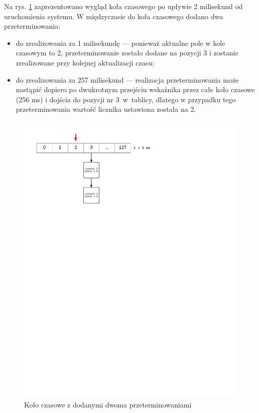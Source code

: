 Na rys. \ref{fig:tiw2} zaprezentowano wygląd koła czasowego po upływie 2 milisekund od uruchomienia systemu.
W międzyczasie do koła czasowego dodano dwa przeterminowania:
\begin{itemize}
\item do zrealizowania za 1 milisekundę --- ponieważ aktualne pole w kole czasowym to 2, przeterminowanie zostało dodane na pozycji 3 i zostanie zrealizowane przy kolejnej aktualizacji czasu;
\item do zrealizowania za 257 milisekund --- realizacja przeterminowania może nastąpić dopiero po dwukrotnym przejściu wskaźnika przez całe koło czasowe (256 ms) i dojścia do pozycji nr 3~w~tablicy, dlatego w przypadku tego przeterminowania wartość licznika ustawiona została na 2.
\end{itemize}

\begin{figure}[h]
\centerline{\includegraphics[scale=0.75, clip, trim=10mm 195mm 80mm 10mm]{tiw2}}
\caption{Koło czasowe z dodanymi dwoma przeterminowaniami}
\label{fig:tiw2}
\end{figure}

